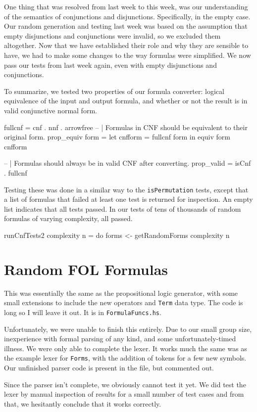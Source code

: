 \documentclass[a4paper,10pt]{article}
\begin{document}
One thing that was resolved from last week to this week, was our understanding of the semantics of conjunctions and disjunctions. Specifically, in the empty case. Our random generation and testing last week was based on the assumption that empty disjunctions and conjunctions were invalid, so we excluded them altogether. Now that we have established their role and why they are sensible to have, we had to make some changes to the way formulas were simplified. We now pass our tests from last week again, even with empty disjunctions and conjunctions.

To summarize, we tested two properties of our formula converter: logical equivalence of the input and output formula, and whether or not the result is in valid conjunctive normal form.

\begin{code}
fullcnf = cnf . nnf . arrowfree
-- | Formulas in CNF should be equivalent to their original form.
prop_equiv form = let cnfform = fullcnf form
                  in equiv form cnfform

-- | Formulas should always be in valid CNF after converting.
prop_valid = isCnf . fullcnf
\end{code}

Testing these was done in a similar way to the \texttt{isPermutation} tests, except that a list of formulas that failed at least one test is returned for inspection. An empty list indicates that all tests passed. In our tests of tens of thousands of random formulas of varying complexity, all passed.
\begin{code}
runCnfTests2 complexity n  = do
    forms <- getRandomForms complexity n
\end{code}

\section{Random FOL Formulas}

This was essentially the same as the propositional logic generator, with some small extensions to include the new operators and \texttt{Term} data type. The code is long so I will leave it out. It is in \texttt{FormulaFuncs.hs}.


Unfortunately, we were unable to finish this entirely. Due to our small group size, inexperience with formal parsing of any kind, and some unfortunately-timed illness. We were only able to complete the lexer. It works much the same was as the example lexer for \texttt{Forms}, with the addition of tokens for a few new symbols. Our unfinished parser code is present in the file, but commented out.

Since the parser isn't complete, we obviously cannot test it yet. We did test the lexer by manual inspection of results for a small number of test cases and from that, we hesitantly conclude that it works correctly.

% 
\end{document}
